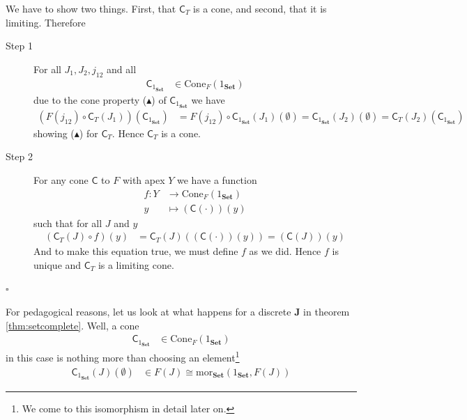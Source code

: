 \begin{prf}
We have to show two things.
First, that $\mathsf{C}_{T}$ is a cone, and second, that it is limiting.
Therefore
\begin{description}
\item[Step 1]
For all $J_{1},J_{2},j_{12}$ and all
\begin{align*}
  \mathsf{C}_{1_{\mathbf{Set}}}
  &\in
  \mathrm{Cone}_{F}(1_{\mathbf{Set}})
\end{align*}
due to the cone property ($\blacktriangle$) of $\mathsf{C}_{1_{\mathbf{Set}}}$ we have
\begin{align*}
  \left(
    F(j_{12})
    \circ
    \mathsf{C}_{T}(J_{1})
  \right)
  \left(
    \mathsf{C}_{1_{\mathbf{Set}}}
  \right)
  &=
  F(j_{12})
  \circ
  \mathsf{C}_{1_{\mathbf{Set}}}(J_{1})(\emptyset)
  =
  \mathsf{C}_{1_{\mathbf{Set}}}(J_{2})(\emptyset)
  =
  \mathsf{C}_{T}(J_{2})
  \left(
    \mathsf{C}_{1_{\mathbf{Set}}}
  \right)
\end{align*}
showing ($\blacktriangle$) for $\mathsf{C}_{T}$.
Hence $\mathsf{C}_{T}$ is a cone.
\item[Step 2]
For any cone $\mathsf{C}$ to $F$ with apex $Y$ we have a function
\begin{align*}
  f
  \colon
  Y
  &\rightarrow
  \mathrm{Cone}_{F}(1_{\mathbf{Set}})
  \\
  y
  &\mapsto
  (\mathsf{C}(\cdot))(y)
\end{align*}
such that for all $J$ and $y$
\begin{align*}
  \left(
    \mathsf{C}_{T}(J)
    \circ
    f
  \right)
  (y)
  &=
  \mathsf{C}_{T}(J)
  \left(
    (\mathsf{C}(\cdot))
    (y)
  \right)
  =
  \left(
    \mathsf{C}(J)
  \right)
  (y)
\end{align*}
And to make this equation true, we must define $f$ as we did.
Hence $f$ is unique and $\mathsf{C}_{T}$ is a limiting cone.
\end{description}
\phantom{proven}
\hfill
$\square$
\end{prf}
For pedagogical reasons, let us look at what happens for a discrete $\mathbf{J}$ in theorem \ref{thm:setcomplete}.
Well, a cone
\begin{align*}
  \mathsf{C}_{1_{\mathbf{Set}}}
  &\in
  \mathrm{Cone}_{F}(1_{\mathbf{Set}})
\end{align*}
in this case is nothing more than choosing an element\footnote{We come to this isomorphism in detail later on.}
\begin{align*}
  \mathsf{C}_{1_{\mathbf{Set}}}(J)(\emptyset)
  &\in
  F(J)
  \cong
  \mathrm{mor}_{\mathbf{Set}}(1_{\mathbf{Set}},F(J))
\end{align*}
